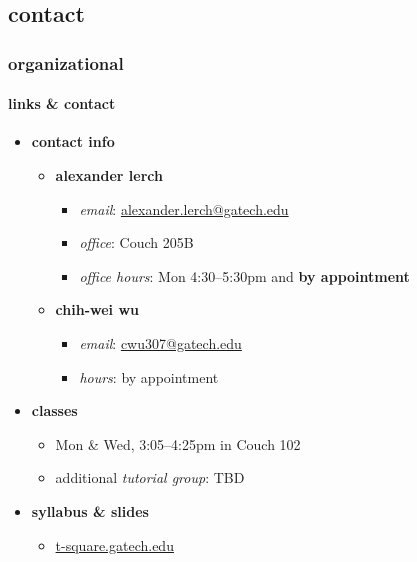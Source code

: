 \subsection{contact} 
    \begin{frame}\frametitle{organizational}\framesubtitle{links \& contact}
        \begin{itemize}
            \item \textbf{contact info}
                \begin{itemize}
                    \item   \textbf{alexander lerch}
                        \begin{itemize}
                            \item   \textit{email}: \url{alexander.lerch@gatech.edu}
                            \item   \textit{office}: Couch 205B
                            \item   \textit{office hours}:  Mon 4:30--5:30pm and \textbf{by appointment}
                        \end{itemize}
                    \item   \textbf{chih-wei wu}
                        \begin{itemize}
                            \item   \textit{email}: \url{cwu307@gatech.edu}
                            \item   \textit{hours}:  by appointment
                        \end{itemize}
                \end{itemize}
            \pause
            \smallskip
            \item \textbf{classes}
                \begin{itemize}
                    \item   Mon \& Wed, 3:05--4:25pm in Couch 102
                    \pause
                    \item   additional \textit{tutorial group}: TBD
                \end{itemize}
            \pause
            \smallskip
            \item \textbf{syllabus \& slides}
                \begin{itemize}
                    \item	\url{t-square.gatech.edu}
                \end{itemize}
        \end{itemize}
    \end{frame}

